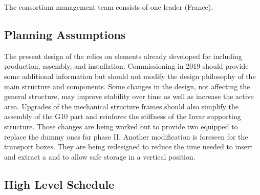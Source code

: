  The consortium management team consists of one leader (France).

\subsection{Planning Assumptions}
\label{ch:dp-crp-planning}
The present design of the  relies on elements already developed for  including production, assembly, and installation. 
Commissioning  in \num{2019} should provide some additional information but should not modify the design philosophy of the main structure and components.  Some changes in the  design, not affecting the general structure, may improve  stability over time as well as increase the active area.  Upgrades of the mechanical structure frames should also simplify the assembly of the G10 part and reinforce the stiffness of the Invar supporting structure. Those changes are being worked out to provide two equipped  to replace the dummy ones for  phase II.
Another modification is foreseen for the transport boxes. They are being redesigned to reduce the time needed to insert and extract a  and to allow safe storage in a vertical position.

\subsection{High Level Schedule}
\label{ch:dp-crp-costschedrisk}

